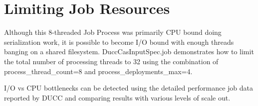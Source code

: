 \section{Limiting Job Resources}
Although this 8-threaded Job Process was primarily CPU bound doing serialization work, it is possible to become I/O bound 
with enough threads banging on a shared filesystem.
DuccCasInputSpec.job demonstrates how to limit the total number of processing threads to 32 using the combination 
of process\_thread\_count=8 and process\_deployments\_max=4.

I/O vs CPU bottlenecks can be detected using the detailed performance job data reported by DUCC and comparing results
with various levels of scale out.
